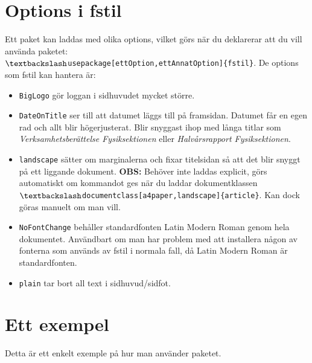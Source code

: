 \documentclass[a4paper]{article}
\newcommand{\bs}{\textbackslash}
\begin{document}
\section{Options i fstil}
Ett paket kan laddas med olika options, vilket görs när du deklarerar att du vill använda paketet:\\ \texttt{$\bs$usepackage[ettOption,ettAnnatOption]\{fstil\}}. De options som fstil kan hantera är:
\begin{itemize}
\item \texttt{BigLogo} gör loggan i sidhuvudet mycket större.

\item \texttt{DateOnTitle} ser till att datumet läggs till på framsidan. Datumet får en egen rad och allt blir högerjusterat. Blir snyggast ihop med långa titlar som \textit{Verksamhetsberättelse Fysiksektionen} eller \textit{Halvårsrapport Fysiksektionen}.

\item \texttt{landscape} sätter om marginalerna och fixar titelsidan så att det blir snyggt på ett liggande dokument. \textbf{OBS:} Behöver inte laddas explicit, görs automatiskt om kommandot ges när du laddar dokumentklassen \texttt{$\bs$documentclass[a4paper,landscape]\{article\}}. Kan dock göras manuelt om man vill.

\item \texttt{NoFontChange} behåller standardfonten Latin Modern Roman genom hela dokumentet. Användbart om man har problem med att installera någon av fonterna som används av fstil i normala fall, då Latin Modern Roman är standardfonten.

\item \texttt{plain} tar bort all text i sidhuvud/sidfot.
\end{itemize}

\section{Ett exempel}
Detta är ett enkelt exemple på hur man använder paketet.
\end{document}
